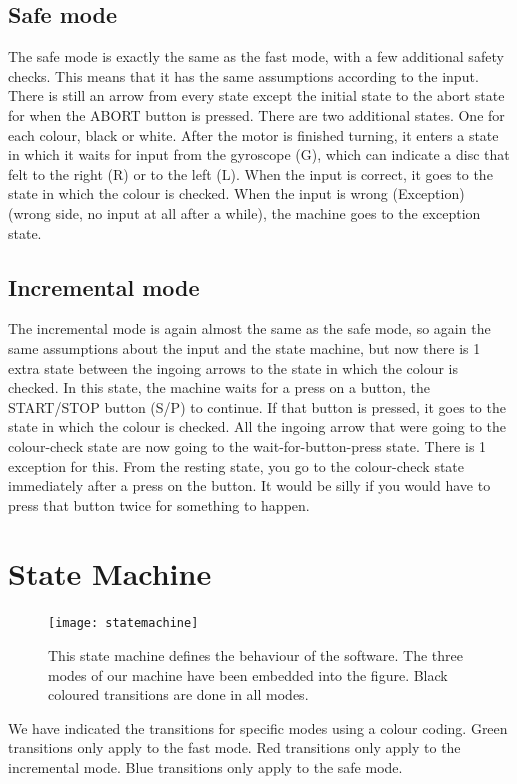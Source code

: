 \documentclass[a4paper,oneside,11pt]{article}
\begin{document}
\newpage

\subsection{Safe mode}
The safe mode is exactly the same as the fast mode, with a few additional safety checks. This means that it has the same assumptions according to the input. There is still an arrow from every state except the initial state to the abort state for when the ABORT button is pressed. There are two additional states. One for each colour, black or white. After the motor is finished turning, it enters a state in which it waits for input from the gyroscope (G), which can indicate a disc that felt to the right (R) or to the left (L). When the input is correct, it goes to the state in which the colour is checked. When the input is wrong (Exception) (wrong side, no input at all after a while), the machine goes to the exception state.
\subsection{Incremental mode}
The incremental mode is again almost the same as the safe mode, so again the same assumptions about the input and the state machine, but now there is 1 extra state between the ingoing arrows to the state in which the colour is checked. In this state, the machine waits for a press on a button, the START/STOP button (S/P) to continue. If that button is pressed, it goes to the state in which the colour is checked. All the ingoing arrow that were going to the colour-check state are now going to the wait-for-button-press state. There is 1 exception for this. From the resting state, you go to the colour-check state immediately after a press on the button. It would be silly if you would have to press that button twice for something to happen.

\section{State Machine}
\begin{figure}[H]
	\centering
	\texttt{[image: statemachine]}
	\caption{This state machine defines the behaviour of the software. The three modes of our machine have been embedded into the figure. Black coloured transitions are done in all modes.}
\end{figure}
We have indicated the transitions for specific modes using a colour coding. Green transitions only apply to the fast mode. Red transitions only apply to the incremental mode. Blue transitions only apply to the safe mode. 
\end{document}
